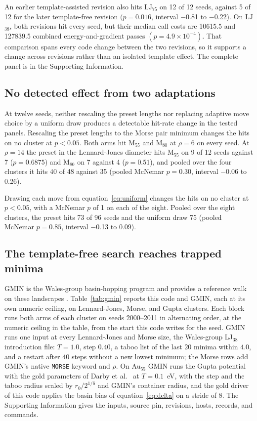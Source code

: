 \documentclass[journal=jctcce,manuscript=article]{achemso}
\begin{document}
An earlier template-assisted revision also hits LJ\(_{75}\) on 12 of 12
seeds, against 5 of 12 for the later template-free revision
\((p=0.016\), interval \(-\)0.81 to \(-\)0.22).
On LJ\(_{38}\), both revisions hit every seed, but their median call costs
are 10615.5 and 127839.5 combined energy-and-gradient passes
\((p=4.9\times 10^{-4})\).
That comparison spans every code change between the two revisions, so it
supports a change across revisions rather than an isolated template effect.
The complete panel is in the Supporting Information.

\subsection{No detected effect from two adaptations}
At twelve seeds, neither rescaling the preset lengths nor replacing adaptive
move choice by a uniform draw produces a detectable hit-rate change in the
tested panels.
Rescaling the preset lengths to the Morse pair minimum changes the hits on no
cluster at \(p<0.05\).
Both arms hit M\(_{55}\) and M\(_{80}\) at \(\rho=6\) on every seed.
At \(\rho=14\) the preset in the Lennard-Jones diameter hits M\(_{55}\) on 9
of 12 seeds against 7 (\(p=0.6875\)) and M\(_{80}\) on 7 against 4
(\(p=0.51\)), and pooled over the four clusters it hits 40 of 48 against 35
(pooled McNemar \(p=0.30\), interval \(-\)0.06 to 0.26).

Drawing each move from equation~\ref{eq:uniform} changes the hits on no
cluster at \(p<0.05\), with a McNemar \(p\) of 1 on each of the eight.
Pooled over the eight clusters, the preset hits 73 of 96 seeds and the uniform
draw 75 (pooled McNemar \(p=0.85\), interval \(-\)0.13 to 0.09).

\subsection{The template-free search reaches trapped minima}
\label{sec:protocol}
\label{sec:gmin}
GMIN is the Wales-group basin-hopping program and provides a reference walk
on these landscapes \cite{wales1997,oakley2013,walesGmin}.
Table~\ref{tab:gmin} reports this code and GMIN, each at its own numeric
ceiling, on Lennard-Jones, Morse, and Gupta clusters.
Each block runs both arms of each cluster on seeds 2000--2011 in
alternating order, at the numeric ceiling in the table, from the start this code
writes for the seed.
GMIN runs one input at every Lennard-Jones and Morse size, the Wales-group
LJ\(_{38}\) introduction file: \(T=1.0\), step \(0.40\), a taboo list of the
last \(20\) minima within \(4.0\), and a restart after \(40\) steps without a
new lowest minimum; the Morse rows add GMIN's native \texttt{MORSE} keyword
and \(\rho\).
On Au\(_{55}\) GMIN runs the Gupta potential with the gold parameters of
Darby et al.\ \cite{darbyCuAu2002} at \(T=0.1\)~eV, with the step and the
taboo radius scaled by \(r_0/2^{1/6}\) and GMIN's container radius, and the
gold driver of this code applies the basin bias of
equation~\ref{eq:delta} on a stride of 8.
The Supporting Information gives the inputs, source pin, revisions, hosts,
records, and commands.
\end{document}
